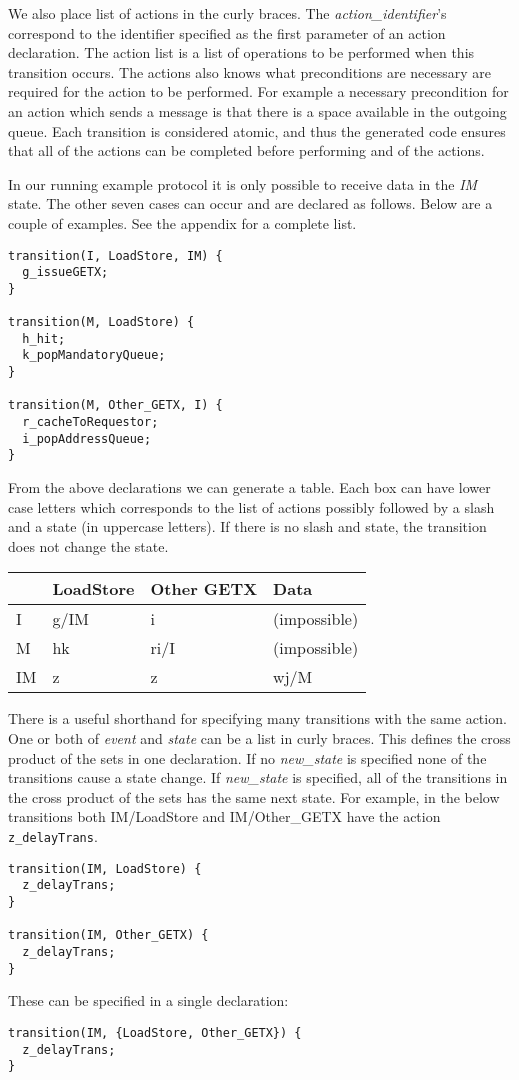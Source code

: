 \documentclass[11pt]{article}
\begin{document}
We also place list of actions in the curly braces.  The {\em
action\_identifier}'s correspond to the identifier specified as the
first parameter of an action declaration.  The action list is a list
of operations to be performed when this transition occurs.  The
actions also knows what preconditions are necessary are required for
the action to be performed.  For example a necessary precondition for
an action which sends a message is that there is a space available in
the outgoing queue.  Each transition is considered atomic, and thus
the generated code ensures that all of the actions can be completed
before performing and of the actions.

In our running example protocol it is only possible to receive data in
the {\em IM} state.  The other seven cases can occur and are declared
as follows.  Below are a couple of examples.  See the appendix for a
complete list.

\newpage
\begin{verbatim}
transition(I, LoadStore, IM) {
  g_issueGETX;
}

transition(M, LoadStore) {
  h_hit;
  k_popMandatoryQueue;
}

transition(M, Other_GETX, I) {
  r_cacheToRequestor;
  i_popAddressQueue;
}
\end{verbatim}

From the above declarations we can generate a table.  Each box can
have lower case letters which corresponds to the list of actions
possibly followed by a slash and a state (in uppercase letters).  If
there is no slash and state, the transition does not change the state.

\begin{center}
\begin{tabular}{|l||l|l|l|} \hline
   & LoadStore & Other GETX & Data \\ \hline  \hline
I & g/IM & i & (impossible)\\ \hline
M & hk & ri/I & (impossible)\\ \hline
IM & z & z & wj/M \\ \hline
\end{tabular}
\end{center}

There is a useful shorthand for specifying many transitions with the
same action.  One or both of {\em event} and {\em state} can be a list
in curly braces.  This defines the cross product of the sets in one
declaration.  If no {\em new\_state} is specified none of the
transitions cause a state change.  If {\em new\_state} is specified,
all of the transitions in the cross product of the sets has the same
next state.  For example, in the below transitions both IM/LoadStore
and IM/Other\_GETX have the action {\tt z\_delayTrans}.
\begin{verbatim}
transition(IM, LoadStore) {
  z_delayTrans;
}

transition(IM, Other_GETX) {
  z_delayTrans;
}
\end{verbatim}
These can be specified in a single declaration:
\begin{verbatim}
transition(IM, {LoadStore, Other_GETX}) {
  z_delayTrans;
}
\end{verbatim}
\end{document}
